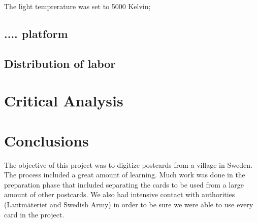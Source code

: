 \documentclass[12 pt]{paper}
\begin{document}
 The light temprerature was set to 5000 Kelvin;
 
 

\subsection{.... platform}%


\subsection{Distribution of labor}

\begin{table}
	
	\caption{}
\end{table}
\section {Critical Analysis}


\section{Conclusions}
The objective of this project was to digitize postcards from a village in Sweden. The process included a great amount of learning. Much work was done in the preparation phase that included separating the cards to be used from a large amount of other postcards. We also had intensive contact with authorities (Lantmäteriet and Swedish Army) in order to be sure we were able to use every card in the project. 


\newpage

%
%
\printbibliography
\end{document}
